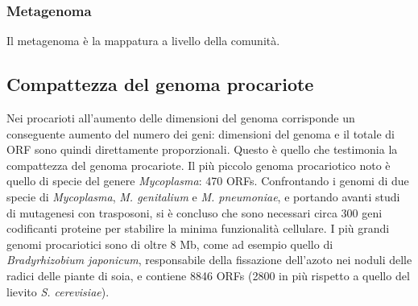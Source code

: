 		\subsubsection{Metagenoma}
		Il metagenoma \`e la mappatura a livello della comunit\`a.

	\subsection{Compattezza del genoma procariote}
	Nei procarioti all'aumento delle dimensioni del genoma corrisponde un conseguente aumento del numero dei geni: dimensioni del genoma e il totale di ORF sono quindi direttamente proporzionali. 
	Questo \`e quello che testimonia la compattezza del genoma procariote.
	Il pi\`u piccolo genoma procariotico noto \`e quello di specie del genere \textit{Mycoplasma}: 470 ORFs.
	Confrontando i genomi di due specie di \textit{Mycoplasma}, \textit{M. genitalium} e \textit{M. pneumoniae}, e portando avanti studi di mutagenesi con trasposoni, si \`e concluso che sono necessari circa 300 geni codificanti proteine per stabilire la minima funzionalit\`a cellulare. 
	I pi\`u grandi genomi procariotici sono di oltre 8 Mb, come ad esempio quello di \textit{Bradyrhizobium japonicum}, responsabile della fissazione dell'azoto nei noduli delle radici delle piante di soia, e contiene 8846 ORFs (2800 in pi\`u rispetto a quello del lievito \textit{S. cerevisiae}).

